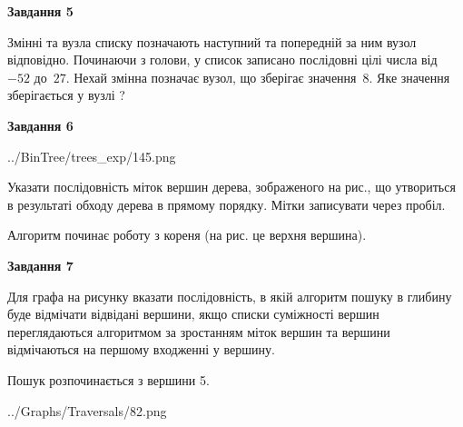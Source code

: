 \documentclass[12pt, ukrainian]{article}
\begin{document}
{\begin {large}
{\begin {center}\textbf{Завдання 5}\end {center}}\par
Змінні  та  вузла списку позначають наступний та попередній за ним вузол відповідно. Починаючи з голови, у список записано послідовні цілі числа від~$-52$ до~$27$. Нехай змінна  позначає вузол, що зберігає значення~$8$.
Яке значення зберігається у вузлі  ?\par
\newpage

{\begin {center}\textbf{Завдання 6}\end {center}}\par

\begin{center}
	{../BinTree/trees_exp/145.png}
\end{center}
Указати послідовність міток вершин дерева, зображеного на рис., що утвориться в результаті обходу дерева в прямому порядку. Мітки записувати через пробіл.\par Алгоритм починає роботу з кореня (на рис. це верхня вершина).\par
\newpage

{\begin {center}\textbf{Завдання 7}\end {center}}\par
Для графа на рисунку вказати послідовність, в якій алгоритм пошуку в глибину буде відмічати відвідані вершини, якщо списки суміжності вершин переглядаються алгоритмом за зростанням міток вершин та вершини відмічаються на першому вход\-женні у вершину.\par
Пошук розпочинається з вершини 5.\par

\begin{center}
	{../Graphs/Traversals/82.png}
\end{center}\par
\newpage


\end{large}}
\end{document}
